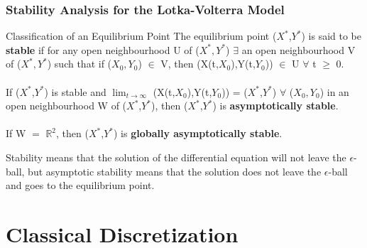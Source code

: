 \documentclass[xcolor={svgnames},hyperref={colorlinks,allcolors=Blue}]{beamer}
\begin{document}
\begin{frame}
\frametitle{Stability Analysis for the Lotka-Volterra Model}

\begin{block}{Classification of an Equilibrium Point}
The equilibrium point ($X^*$,$Y^*$) is said to be \textbf{stable} if for any open neighbourhood U of ($X^*,Y^*$) $\exists$ an open neighbourhood V of ($X^*,Y^*$) such that if ($X_0,Y_0$) $\in$ V, then (X(t,$X_0$),Y(t,$Y_0$)) $\in$ U $\forall$ t $\geqslant$ 0. \\~\\ 

If ($X^*$,$Y^*$) is stable and $\lim_{t\to\infty}$ (X(t,$X_0$),Y(t,$Y_0$)) = ($X^*$,$Y^*$) $\forall$ ($X_0,Y_0$) in an open neighbourhood W of ($X^*$,$Y^*$), then ($X^*$,$Y^*$) is \textbf{asymptotically stable}. \\~\\

If W $=$ $\mathbb{R}^2$, then ($X^*$,$Y^*$) is \textbf{globally asymptotically stable}.
\end{block}

\pause
Stability means that the solution of the differential equation will not leave the $\epsilon$-ball, \pause but asymptotic stability means that the solution does not leave the $\epsilon$-ball and goes to the equilibrium point.
	\end{frame}

%
%
%	



\section{Classical Discretization}
\end{document}
